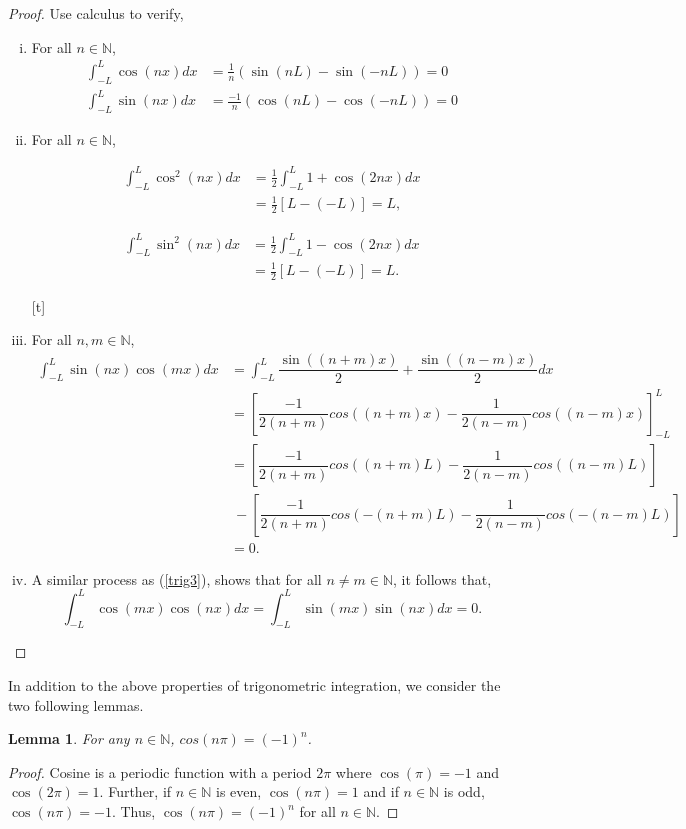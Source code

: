 \documentclass[11pt]{amsart}
\theoremstyle{plain}
\newtheorem{lemma}[theorem]{Lemma}
\theoremstyle{definition}
\newcommand{\N}{\mathbb N}
\begin{document}
\begin{proof} Use calculus to verify,
    \begin{enumerate}[(i)]
    \setlength\itemsep{1em}
        \item For all $n\in \N$, \begin{align*}
            \int_{-L}^L \cos(nx)dx &= \frac{1}{n}(\sin(nL)-\sin(-nL)) = 0 \\
            \int_{-L}^L \sin(nx)dx &= \frac{-1}{n}(\cos(nL)-\cos(-nL)) = 0 \end{align*}
        \item For all $n\in \N$, \\
        \begin{minipage}{0.5\textwidth}
            \begin{align*}
                \int_{-L}^L \cos^2(nx)dx &= \frac{1}{2}\int_{-L}^L 1+ \cos(2nx)dx \\
                &= \frac{1}{2} \left[ L -(-L) \right] = L,
            \end{align*}
        \end{minipage}
        \begin{minipage}{0.5\textwidth}
        \begin{align*}
            \int_{-L}^L \sin^2(nx)dx &= \frac{1}{2}\int_{-L}^L 1- \cos(2nx)dx \\
            &= \frac{1}{2} \left[ L -(-L) \right] = L.
        \end{align*}
        \end{minipage}[t]
        \item For all $n,m \in \N$,
        \begin{align*}
            \int_{-L}^{L} \sin(nx)\cos(mx)dx &= \int_{-L}^{L} \dfrac{\sin((n+m)x)}{2} + \dfrac{\sin((n-m)x)}{2}dx\\
            &= \left[\dfrac{-1}{2(n+m)}cos((n+m)x)-\dfrac{1}{2(n-m)}cos((n-m)x)\right]_{-L}^L\\
            &= \left[\dfrac{-1}{2(n+m)}cos((n+m)L)-\dfrac{1}{2(n-m)}cos((n-m)L)\right]\\
            &\ -\left[\dfrac{-1}{2(n+m)}cos(-(n+m)L)-\dfrac{1}{2(n-m)}cos(-(n-m)L)\right]\\
            &= 0.
        \end{align*}
        \item A similar process as (\ref{trig3}), shows that for all $n\neq m\in \N$, it follows that, $$\int_{-L}^{L} \cos(mx)\cos(nx)dx =\int_{-L}^{L} \sin(mx)\sin(nx)dx  = 0.$$
    \end{enumerate}
\end{proof}
In addition to the above properties of trigonometric integration, we consider the two following lemmas. 
\begin{lemma} \label{lem:trig1}
    For any $n\in\N$, $cos(n\pi) = (-1)^n$.
\end{lemma}
\vspace{-0.5cm}
\begin{proof}
    Cosine is a periodic function with a period $2\pi$ where $\cos(\pi) = -1$ and $\cos(2\pi)= 1$. Further, if $n \in \N$ is even, $\cos(n\pi)= 1$ and if $n \in \N$ is odd, $\cos(n\pi) = -1.$ Thus, $\cos(n\pi) = (-1)^n$ for all $n\in\N.$
\end{proof}
\end{document}
